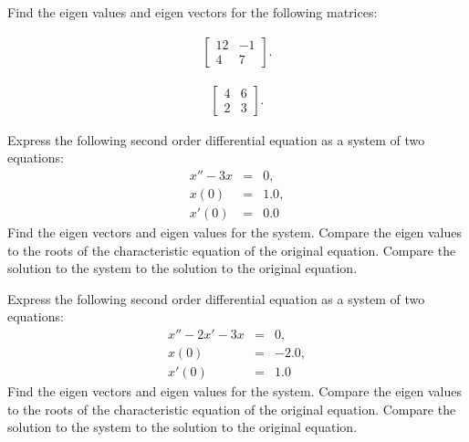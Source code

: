 

\begin{problem}
\item  Find the eigen values and eigen vectors for the following matrices:

  \begin{subproblem}
  \item
    \begin{eqnarray*}
      \left[
        \begin{array}{rr}
          12 & -1 \\
          4 & 7
        \end{array}
      \right].
    \end{eqnarray*}
    \vfill

  \item 
    \begin{eqnarray*}
      \left[
        \begin{array}{rr}
          4 & 6 \\
          2 & 3
        \end{array}
      \right].
    \end{eqnarray*}
    \vfill
      
  \end{subproblem}
\end{problem}

\begin{problem}
\item Express the following second order differential equation as a
  system of two equations:
  \begin{eqnarray*}
    x'' - 3x & = & 0, \\
    x(0) & = & 1.0, \\
    x'(0) & = & 0.0
  \end{eqnarray*}
  Find the eigen vectors and eigen values for the system. Compare the
  eigen values to the roots of the characteristic equation of the
  original equation. Compare the solution to the system to the
  solution to the original equation.

  \vfill



  \clearpage

\item Express the following second order differential equation as a
  system of two equations:
  \begin{eqnarray*}
    x'' - 2x' - 3x & = & 0, \\
    x(0) & = & -2.0, \\
    x'(0) & = & 1.0
  \end{eqnarray*}
    Find the eigen vectors and eigen values for the system. Compare
    the eigen values to the roots of the characteristic equation of
    the original equation. Compare the solution to the system to the
    solution to the original equation.

    \vfill


  \end{problem}


